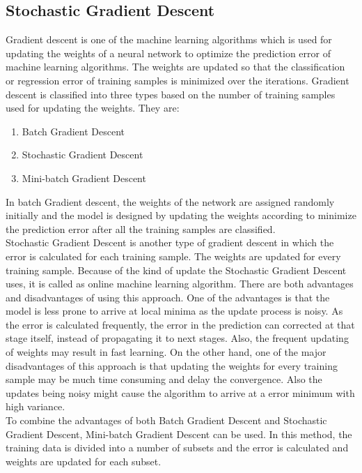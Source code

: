 \documentclass[sigconf]{acmart}
\begin{document}
\subsection{Stochastic Gradient Descent}
Gradient descent is one of the machine learning algorithms which is used for updating the weights of a neural network to optimize the prediction error of machine learning algorithms. The weights are updated so that the classification or regression error of training samples is minimized over the iterations. Gradient descent is classified into three types based on the number of training samples used for updating the weights. They are:
\begin{enumerate}
    \item Batch Gradient Descent
    \item Stochastic Gradient Descent
    \item Mini-batch Gradient Descent
\end{enumerate}
In batch Gradient descent, the weights of the network are assigned randomly initially and the model is designed by updating the weights according to minimize the prediction error after all the training samples are classified.  \\
Stochastic Gradient Descent is another type of gradient descent in which the error is calculated for each training sample. The weights are updated for every training sample. Because of the kind of update the Stochastic Gradient Descent uses, it is called as online machine learning algorithm. There are both advantages and disadvantages of using this approach. One of the advantages is that the model is less prone to arrive at local minima as the update process is noisy. As the error is calculated frequently, the error in the prediction can corrected at that stage itself, instead of propagating it to next stages. Also, the frequent updating of weights may result in fast learning. On the other hand, one of the major disadvantages of this approach is that updating the weights for every training sample may be much time consuming and delay the convergence. Also the updates being noisy might cause the algorithm to arrive at a error minimum with high variance.\\
To combine the advantages of both Batch Gradient Descent and Stochastic Gradient Descent, Mini-batch Gradient Descent can be used. In this method, the training data is divided into a number of subsets and the error is calculated and weights are updated for each subset. 
\end{document}
